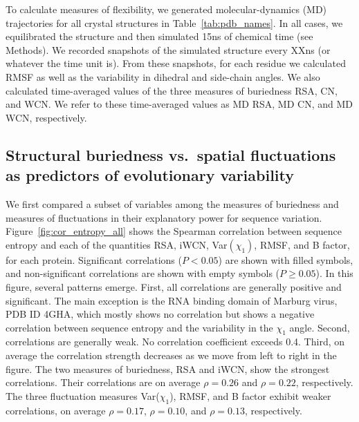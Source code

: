 \documentclass[12pt]{article}
\begin{document}
To calculate measures of flexibility, we generated molecular-dynamics (MD) trajectories for all crystal structures in Table~\ref{tab:pdb_names}. In all cases, we equilibrated the structure and then simulated 15ns of chemical time (see Methods). We recorded snapshots of the simulated structure every {\color{red}XXns (or whatever the time unit is)}. From these snapshots, for each residue we calculated RMSF as well as the variability in dihedral and side-chain angles. We also calculated time-averaged values of the three measures of buriedness RSA, CN, and WCN. We refer to these time-averaged values as MD RSA, MD CN, and MD WCN, respectively.


\subsection*{Structural buriedness vs.\ spatial fluctuations as predictors of evolutionary variability}

We first compared a subset of variables among the measures of buriedness and measures of fluctuations in their explanatory power for sequence variation. Figure~\ref{fig:cor_entropy_all} shows the Spearman correlation between sequence entropy and each of the quantities RSA, iWCN, Var$(\chi_1)$, RMSF, and B factor, for each protein. Significant correlations ($P<0.05$) are shown with filled symbols, and non-significant correlations are shown with empty symbols ($P\geq0.05$).
In this figure, several patterns emerge. First, all correlations are generally positive and significant. The main exception is the RNA binding domain of Marburg virus, PDB ID 4GHA, which mostly shows no correlation but shows a negative correlation between sequence entropy and the variability in the $\chi_1$ angle. Second, correlations are generally weak. No correlation coefficient exceeds 0.4. Third, on average the correlation strength decreases as we move from left to right in the figure. The two measures of buriedness, RSA and iWCN, show the strongest correlations. Their correlations are on average $\rho=0.26$ and $\rho=0.22$, respectively. The three fluctuation measures Var($\chi_1$), RMSF, and B factor exhibit weaker correlations, on average $\rho=0.17$, $\rho=0.10$, and $\rho=0.13$, respectively.
\end{document}
